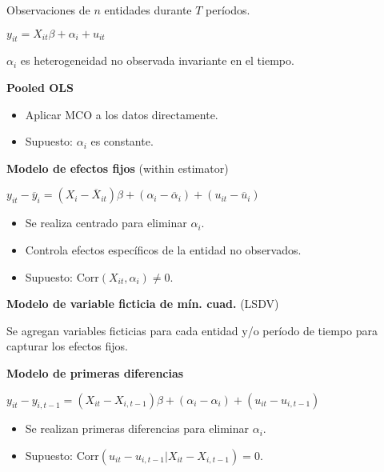 \documentclass[10pt, a4paper, landscape]{article}
\newcommand{\Corr}{\mathrm{Corr}}
\begin{document}
\begin{multicols}{3}
		Observaciones de $n$ entidades durante $T$ períodos.
		
		\begin{center}
			$y_{it} = X_{it} \beta + \alpha_{i} + u_{it}$
		\end{center}
		
		$\alpha_{i}$ es heterogeneidad no observada invariante en el tiempo.
		
		\textbf{Pooled OLS}
		
		\begin{itemize}[leftmargin=*]
			\item Aplicar MCO a los datos directamente.
			\item Supuesto: $\alpha_i$ es constante.
		\end{itemize}
		
		\textbf{Modelo de efectos fijos} (within estimator)
		
		\begin{center}
			$y_{it} - \overline{y}_{i} = (X_{i} - \overline{X}_{it}) \beta + (\alpha_{i} - \overline{\alpha}_i) + (u_{it} - \overline{u}_{i})$
		\end{center}
		
		\begin{itemize}[leftmargin=*]
			\item Se realiza centrado para eliminar $\alpha_i$.
			\item Controla efectos específicos de la entidad no observados.
			\item Supuesto: $\Corr(X_{it}, \alpha_i) \neq 0$.
		\end{itemize}
		
		\textbf{Modelo de variable ficticia de mín. cuad.} (LSDV)
		
		Se agregan variables ficticias para cada entidad y/o período de tiempo para capturar los efectos fijos.
		
		\textbf{Modelo de primeras diferencias}
		
		\begin{center}
			$y_{it} - y_{i,t-1} = (X_{it} - X_{i,t-1}) \beta + (\alpha_{i} - \alpha_i) + (u_{it} - u_{i,t-1})$
		\end{center}
		
		\begin{itemize}[leftmargin=*]
			\item Se realizan primeras diferencias para eliminar $\alpha_i$.
			\item Supuesto: $\Corr(u_{it} - u_{i,t-1} | X_{it} - X_{i,t-1}) = 0$.
		\end{itemize}
		

\end{multicols}
\end{document}
